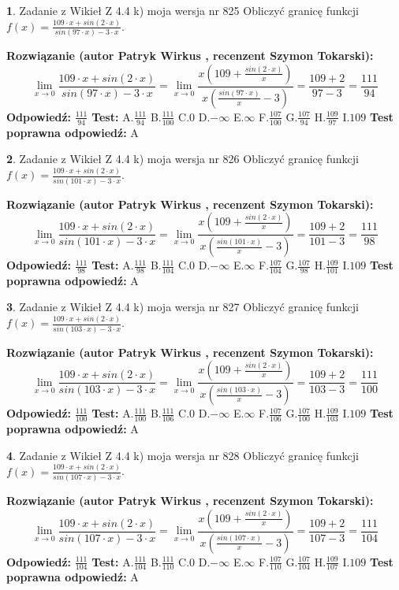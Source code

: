 \documentclass[12pt, a4paper]{article}
\theoremstyle{definition} %
\newtheorem{zad}{}
\newcommand{\zadStart}[1]{\begin{zad}#1\newline}
\newcommand{\zadStop}{\end{zad}}
\newcommand{\rozwStart}[2]{\noindent \textbf{Rozwiązanie (autor #1 , recenzent #2): }\newline}
\newcommand{\rozwStop}{\newline}
\newcommand{\odpStart}{\noindent \textbf{Odpowiedź:}\newline}
\newcommand{\odpStop}{\newline}
\newcommand{\testStart}{\noindent \textbf{Test:}\newline}
\newcommand{\testStop}{\newline}
\newcommand{\kluczStart}{\noindent \textbf{Test poprawna odpowiedź:}\newline}
\newcommand{\kluczStop}{\newline}
\begin{document}
\zadStart{Zadanie z Wikieł Z 4.4 k) moja wersja nr 825}
Obliczyć granicę funkcji $f(x)=\frac{109\cdot x +sin(2\cdot x)}{sin(97\cdot x) -3\cdot x}$.
\zadStop
\rozwStart{Patryk Wirkus}{Szymon Tokarski}
$$\lim\limits_{x\to 0}\frac{109\cdot x +sin(2\cdot x)}{sin(97\cdot x) -3\cdot x}
=\lim\limits_{x\to 0}\frac{x(109+\frac{sin(2\cdot x)}{x})}{x(\frac{sin(97\cdot x)}{x}-3)}
=\frac{109+2}{97-3} = \frac{111}{94}$$
\rozwStop
\odpStart
$\frac{111}{94}$
\odpStop
\testStart
A.$\frac{111}{94}$
B.$\frac{111}{100}$
C.$0$
D.$-\infty$
E.$\infty$
F.$\frac{107}{100}$
G.$\frac{107}{94}$
H.$\frac{109}{97}$
I.$109$
\testStop
\kluczStart
A
\kluczStop



\zadStart{Zadanie z Wikieł Z 4.4 k) moja wersja nr 826}
Obliczyć granicę funkcji $f(x)=\frac{109\cdot x +sin(2\cdot x)}{sin(101\cdot x) -3\cdot x}$.
\zadStop
\rozwStart{Patryk Wirkus}{Szymon Tokarski}
$$\lim\limits_{x\to 0}\frac{109\cdot x +sin(2\cdot x)}{sin(101\cdot x) -3\cdot x}
=\lim\limits_{x\to 0}\frac{x(109+\frac{sin(2\cdot x)}{x})}{x(\frac{sin(101\cdot x)}{x}-3)}
=\frac{109+2}{101-3} = \frac{111}{98}$$
\rozwStop
\odpStart
$\frac{111}{98}$
\odpStop
\testStart
A.$\frac{111}{98}$
B.$\frac{111}{104}$
C.$0$
D.$-\infty$
E.$\infty$
F.$\frac{107}{104}$
G.$\frac{107}{98}$
H.$\frac{109}{101}$
I.$109$
\testStop
\kluczStart
A
\kluczStop



\zadStart{Zadanie z Wikieł Z 4.4 k) moja wersja nr 827}
Obliczyć granicę funkcji $f(x)=\frac{109\cdot x +sin(2\cdot x)}{sin(103\cdot x) -3\cdot x}$.
\zadStop
\rozwStart{Patryk Wirkus}{Szymon Tokarski}
$$\lim\limits_{x\to 0}\frac{109\cdot x +sin(2\cdot x)}{sin(103\cdot x) -3\cdot x}
=\lim\limits_{x\to 0}\frac{x(109+\frac{sin(2\cdot x)}{x})}{x(\frac{sin(103\cdot x)}{x}-3)}
=\frac{109+2}{103-3} = \frac{111}{100}$$
\rozwStop
\odpStart
$\frac{111}{100}$
\odpStop
\testStart
A.$\frac{111}{100}$
B.$\frac{111}{106}$
C.$0$
D.$-\infty$
E.$\infty$
F.$\frac{107}{106}$
G.$\frac{107}{100}$
H.$\frac{109}{103}$
I.$109$
\testStop
\kluczStart
A
\kluczStop



\zadStart{Zadanie z Wikieł Z 4.4 k) moja wersja nr 828}
Obliczyć granicę funkcji $f(x)=\frac{109\cdot x +sin(2\cdot x)}{sin(107\cdot x) -3\cdot x}$.
\zadStop
\rozwStart{Patryk Wirkus}{Szymon Tokarski}
$$\lim\limits_{x\to 0}\frac{109\cdot x +sin(2\cdot x)}{sin(107\cdot x) -3\cdot x}
=\lim\limits_{x\to 0}\frac{x(109+\frac{sin(2\cdot x)}{x})}{x(\frac{sin(107\cdot x)}{x}-3)}
=\frac{109+2}{107-3} = \frac{111}{104}$$
\rozwStop
\odpStart
$\frac{111}{104}$
\odpStop
\testStart
A.$\frac{111}{104}$
B.$\frac{111}{110}$
C.$0$
D.$-\infty$
E.$\infty$
F.$\frac{107}{110}$
G.$\frac{107}{104}$
H.$\frac{109}{107}$
I.$109$
\testStop
\kluczStart
A
\kluczStop
\end{document}
